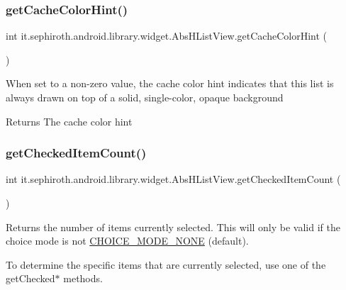 \subsubsection{\texorpdfstring{get\+Cache\+Color\+Hint()}{getCacheColorHint()}}
{\footnotesize\ttfamily int it.\+sephiroth.\+android.\+library.\+widget.\+Abs\+H\+List\+View.\+get\+Cache\+Color\+Hint (\begin{DoxyParamCaption}{ }\end{DoxyParamCaption})}

When set to a non-\/zero value, the cache color hint indicates that this list is always drawn on top of a solid, single-\/color, opaque background

\begin{DoxyReturn}{Returns}
The cache color hint 
\end{DoxyReturn}
\mbox{\label{classit_1_1sephiroth_1_1android_1_1library_1_1widget_1_1_abs_h_list_view_a301cf69cc4195b012762ac522e99493c}} 
\subsubsection{\texorpdfstring{get\+Checked\+Item\+Count()}{getCheckedItemCount()}}
{\footnotesize\ttfamily int it.\+sephiroth.\+android.\+library.\+widget.\+Abs\+H\+List\+View.\+get\+Checked\+Item\+Count (\begin{DoxyParamCaption}{ }\end{DoxyParamCaption})}

Returns the number of items currently selected. This will only be valid if the choice mode is not \hyperlink{}{C\+H\+O\+I\+C\+E\+\_\+\+M\+O\+D\+E\+\_\+\+N\+O\+NE} (default).

To determine the specific items that are currently selected, use one of the {\ttfamily get\+Checked$\ast$} methods.

